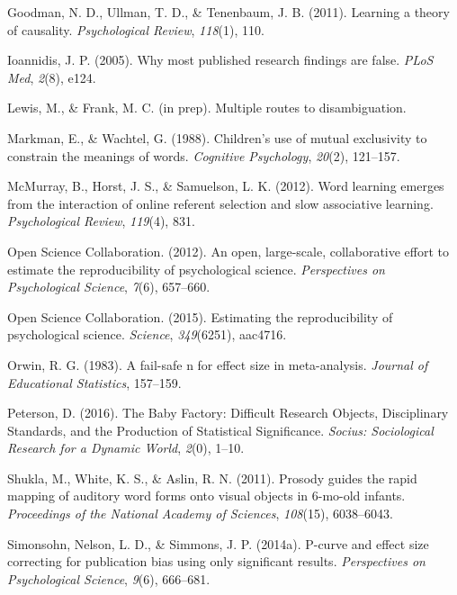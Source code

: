 \documentclass[english,floatsintext,man]{apa6}
\begin{document}
\hypertarget{ref-goodman2011learning}{}
Goodman, N. D., Ullman, T. D., \& Tenenbaum, J. B. (2011). Learning a
theory of causality. \emph{Psychological Review}, \emph{118}(1), 110.

\hypertarget{ref-ioannidis2005most}{}
Ioannidis, J. P. (2005). Why most published research findings are false.
\emph{PLoS Med}, \emph{2}(8), e124.

\hypertarget{ref-lfprep}{}
Lewis, M., \& Frank, M. C. (in prep). Multiple routes to disambiguation.

\hypertarget{ref-markman1988}{}
Markman, E., \& Wachtel, G. (1988). Children's use of mutual exclusivity
to constrain the meanings of words. \emph{Cognitive Psychology},
\emph{20}(2), 121--157.

\hypertarget{ref-mcmurray2012word}{}
McMurray, B., Horst, J. S., \& Samuelson, L. K. (2012). Word learning
emerges from the interaction of online referent selection and slow
associative learning. \emph{Psychological Review}, \emph{119}(4), 831.

\hypertarget{ref-open2012open}{}
Open Science Collaboration. (2012). An open, large-scale, collaborative
effort to estimate the reproducibility of psychological science.
\emph{Perspectives on Psychological Science}, \emph{7}(6), 657--660.

\hypertarget{ref-open2015estimating}{}
Open Science Collaboration. (2015). Estimating the reproducibility of
psychological science. \emph{Science}, \emph{349}(6251), aac4716.

\hypertarget{ref-orwin1983fail}{}
Orwin, R. G. (1983). A fail-safe n for effect size in meta-analysis.
\emph{Journal of Educational Statistics}, 157--159.

\hypertarget{ref-Peterson:2016}{}
Peterson, D. (2016). The Baby Factory: Difficult Research Objects,
Disciplinary Standards, and the Production of Statistical Significance.
\emph{Socius: Sociological Research for a Dynamic World}, \emph{2}(0),
1--10.

\hypertarget{ref-shukla2011prosody}{}
Shukla, M., White, K. S., \& Aslin, R. N. (2011). Prosody guides the
rapid mapping of auditory word forms onto visual objects in 6-mo-old
infants. \emph{Proceedings of the National Academy of Sciences},
\emph{108}(15), 6038--6043.

\hypertarget{ref-simonsohn2014power}{}
Simonsohn, Nelson, L. D., \& Simmons, J. P. (2014a). P-curve and effect
size correcting for publication bias using only significant results.
\emph{Perspectives on Psychological Science}, \emph{9}(6), 666--681.
\end{document}
